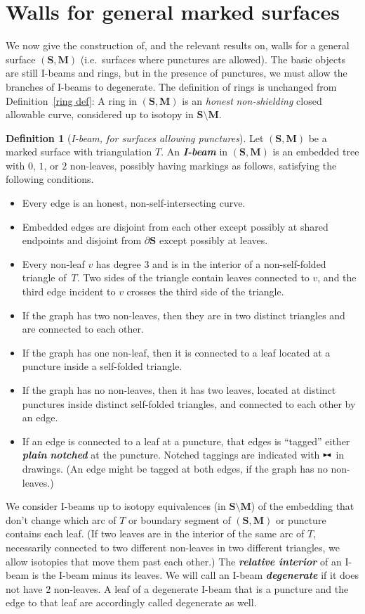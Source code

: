 \documentclass{amsart}
\theoremstyle{definition}
\newtheorem{definition}[proposition]{Definition}
\theoremstyle{remark}
\numberwithin{equation}{section}
\newcommand{\newword}[1]{\textbf{\emph{#1}}}
\newcommand{\0}{{\mathbf{0}}}
\newcommand{\M}{\mathbf{M}}
\renewcommand{\S}{\mathbf{S}}
\newcommand{\notch}{^{\scalebox{0.6}{\raisebox{-3pt}{$\mathrel \blacktriangleright \joinrel \mathrel \blacktriangleleft$}}}}
\begin{document}
\section{Walls for general marked surfaces}\label{general walls sec}
We now give the construction of, and the relevant results on, walls for a general surface $(\S,\M)$ (i.e.\ surfaces where punctures are allowed).
The basic objects are still I-beams and rings, but in the presence of punctures, we must allow the branches of I-beams to degenerate.
The definition of rings is unchanged from Definition~\ref{ring def}:  A ring in $(\S,\M)$ is an \emph{honest} \emph{non-shielding} closed allowable curve, considered up to isotopy in $\S\setminus\M$.

\begin{definition}[\emph{I-beam, for surfaces allowing punctures}]\label{def: i-beam}
Let $(\S,\M)$ be a marked surface with triangulation $T$.  
An \newword{I-beam} in $(\S,\M)$ is an embedded tree with $0$, $1$, or $2$ non-leaves, possibly having markings as follows, satisfying the following conditions.
\begin{itemize}
\item Every edge is an honest, non-self-intersecting curve.
\item Embedded edges are disjoint from each other except possibly at shared endpoints and disjoint from $\partial\S$ except possibly at leaves.
\item Every non-leaf $v$ has degree $3$ and is in the interior of a non-self-folded triangle of~$T$.
Two sides of the triangle contain leaves connected to $v$, and the third edge incident to $v$ crosses the third side of the triangle.
\item If the graph has two non-leaves, then they are in two distinct triangles and are connected to each other.
\item If the graph has one non-leaf, then it is connected to a leaf located at a puncture inside a self-folded triangle. 
\item If the graph has no non-leaves, then it has two leaves, located at distinct punctures inside distinct self-folded triangles, and connected to each other by an edge.
\item 
If an edge is connected to a leaf at a puncture, that edges is ``tagged'' either \newword{plain} \newword{notched} at the puncture.  
Notched taggings are indicated with $\notch$ in drawings.
(An edge might be tagged at both edges, if the graph has no non-leaves.)
\end{itemize}
We consider I-beams up to isotopy equivalences (in $\S\setminus\M$) of the embedding that don't change which arc of $T$ or boundary segment of $(\S,\M)$ or puncture contains each leaf.
(If two leaves are in the interior of the same arc of $T$, necessarily connected to two different non-leaves in two different triangles, we allow isotopies that move them past each other.)  The \newword{relative interior} of an I-beam is the I-beam minus its leaves.
We will call an I-beam \newword{degenerate} if it does not have $2$ non-leaves.
A leaf of a degenerate I-beam that is a puncture and the edge to that leaf are accordingly called degenerate as well.
\end{definition}
\end{document}
